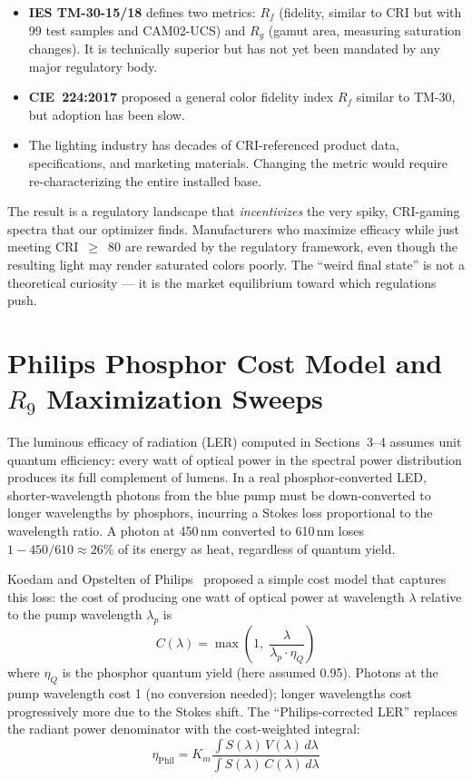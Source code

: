 \documentclass[11pt]{article}
\begin{document}
\begin{itemize}
\item \textbf{IES TM-30-15/18} defines two metrics: $R_f$ (fidelity,
  similar to CRI but with 99 test samples and CAM02-UCS) and $R_g$ (gamut
  area, measuring saturation changes).  It is technically superior but
  has not yet been mandated by any major regulatory body.
\item \textbf{CIE~224:2017} proposed a general color fidelity index $R_f$
  similar to TM-30, but adoption has been slow.
\item The lighting industry has decades of CRI-referenced product data,
  specifications, and marketing materials.  Changing the metric would
  require re-characterizing the entire installed base.
\end{itemize}

The result is a regulatory landscape that \emph{incentivizes} the very
spiky, CRI-gaming spectra that our optimizer finds.  Manufacturers who
maximize efficacy while just meeting CRI~$\geq$~80 are rewarded by the
regulatory framework, even though the resulting light may render saturated
colors poorly.  The ``weird final state'' is not a theoretical curiosity
--- it is the market equilibrium toward which regulations push.

\section{Philips Phosphor Cost Model and $R_9$ Maximization Sweeps}
\label{sec:philips}

The luminous efficacy of radiation (LER) computed in
Sections~3--4 assumes unit quantum efficiency: every watt of optical power
in the spectral power distribution produces its full complement of lumens.
In a real phosphor-converted LED, shorter-wavelength photons from the blue
pump must be down-converted to longer wavelengths by phosphors, incurring
a Stokes loss proportional to the wavelength ratio.  A photon at 450\,nm
converted to 610\,nm loses $1 - 450/610 \approx 26\%$ of its energy as heat,
regardless of quantum yield.

Koedam and Opstelten of Philips~\cite{walter1978} proposed a simple cost
model that captures this loss: the cost of producing one watt of optical
power at wavelength $\lambda$ relative to the pump wavelength $\lambda_p$
is
\begin{equation}
C(\lambda) = \max\!\left(1,\; \frac{\lambda}{\lambda_p \cdot \eta_Q}\right)
\end{equation}
where $\eta_Q$ is the phosphor quantum yield (here assumed 0.95).  Photons
at the pump wavelength cost 1 (no conversion needed); longer wavelengths
cost progressively more due to the Stokes shift.  The ``Philips-corrected
LER'' replaces the radiant power denominator with the cost-weighted integral:
\begin{equation}
\eta_{\text{Phil}} = K_m \frac{\int S(\lambda)\, V(\lambda)\, d\lambda}
                               {\int S(\lambda)\, C(\lambda)\, d\lambda}
\end{equation}
\end{document}
